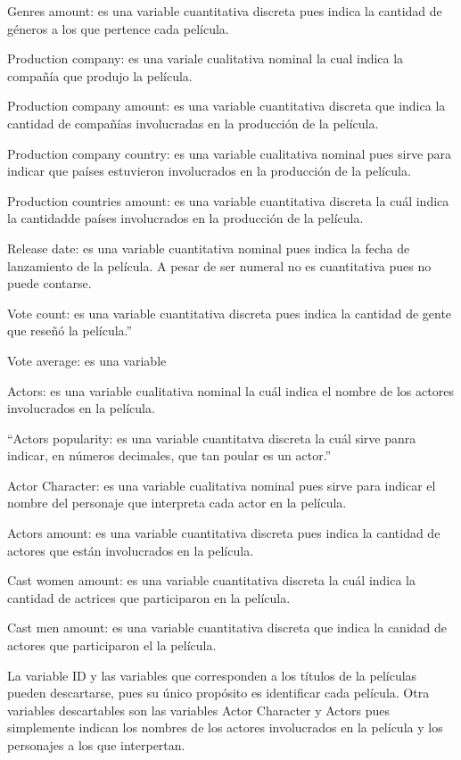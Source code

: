\documentclass[
]{article}
\begin{document}
Genres amount: es una variable cuantitativa discreta pues indica la
cantidad de géneros a los que pertence cada película.

Production company: es una variale cualitativa nominal la cual indica la
compañía que produjo la película.

Production company amount: es una variable cuantitativa discreta que
indica la cantidad de compañías involucradas en la producción de la
película.

Production company country: es una variable cualitativa nominal pues
sirve para indicar que países estuvieron involucrados en la producción
de la película.

Production countries amount: es una variable cuantitativa discreta la
cuál indica la cantidadde países involucrados en la producción de la
película.

Release date: es una variable cuantitativa nominal pues indica la fecha
de lanzamiento de la película. A pesar de ser numeral no es cuantitativa
pues no puede contarse.

Vote count: es una variable cuantitativa discreta pues indica la
cantidad de gente que reseñó la película.''

Vote average: es una variable

Actors: es una variable cualitativa nominal la cuál indica el nombre de
los actores involucrados en la película.

``Actors popularity: es una variable cuantitatva discreta la cuál sirve
panra indicar, en números decimales, que tan poular es un actor.''

Actor Character: es una variable cualitativa nominal pues sirve para
indicar el nombre del personaje que interpreta cada actor en la
película.

Actors amount: es una variable cuantitativa discreta pues indica la
cantidad de actores que están involucrados en la película.

Cast women amount: es una variable cuantitativa discreta la cuál indica
la cantidad de actrices que participaron en la película.

Cast men amount: es una variable cuantitativa discreta que indica la
canidad de actores que participaron el la película.

La variable ID y las variables que corresponden a los títulos de la
películas pueden descartarse, pues su único propósito es identificar
cada película. Otra variables descartables son las variables Actor
Character y Actors pues simplemente indican los nombres de los actores
involucrados en la película y los personajes a los que interpertan.
\end{document}
